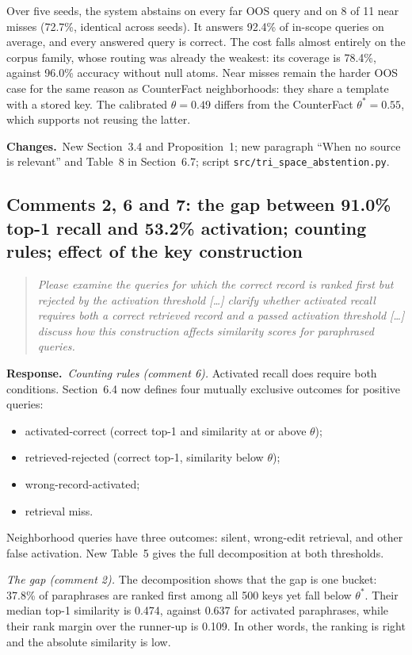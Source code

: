 \documentclass[11pt]{article}
\newenvironment{reviewer}{\par\medskip\noindent\begin{quote}\itshape}{\end{quote}}
\newcommand{\response}{\par\noindent\textbf{Response.}\ }
\newcommand{\changes}{\par\smallskip\noindent\textbf{Changes.}\ }
\begin{document}
Over five seeds, the system abstains on every far OOS query and on 8 of 11 near misses (72.7\%, identical across seeds). It answers 92.4\% of in-scope queries on average, and every answered query is correct. The cost falls almost entirely on the corpus family, whose routing was already the weakest: its coverage is 78.4\%, against 96.0\% accuracy without null atoms. Near misses remain the harder OOS case for the same reason as CounterFact neighborhoods: they share a template with a stored key. The calibrated $\theta=0.49$ differs from the CounterFact $\theta^*=0.55$, which supports not reusing the latter.

\changes New Section~3.4 and Proposition~1; new paragraph ``When no source is relevant'' and Table~8 in Section~6.7; script \texttt{src/tri\_space\_abstention.py}.

\subsection*{Comments 2, 6 and 7: the gap between 91.0\% top-1 recall and 53.2\% activation; counting rules; effect of the key construction}

\begin{reviewer}
Please examine the queries for which the correct record is ranked first but rejected by the activation threshold [\dots] clarify whether activated recall requires both a correct retrieved record and a passed activation threshold [\dots] discuss how this construction affects similarity scores for paraphrased queries.
\end{reviewer}

\response \emph{Counting rules (comment 6).} Activated recall does require both conditions. Section~6.4 now defines four mutually exclusive outcomes for positive queries:
\begin{itemize}
\item activated-correct (correct top-1 and similarity at or above $\theta$);
\item retrieved-rejected (correct top-1, similarity below $\theta$);
\item wrong-record-activated;
\item retrieval miss.
\end{itemize}
Neighborhood queries have three outcomes: silent, wrong-edit retrieval, and other false activation. New Table~5 gives the full decomposition at both thresholds.

\emph{The gap (comment 2).} The decomposition shows that the gap is one bucket: 37.8\% of paraphrases are ranked first among all 500 keys yet fall below $\theta^*$. Their median top-1 similarity is 0.474, against 0.637 for activated paraphrases, while their rank margin over the runner-up is 0.109. In other words, the ranking is right and the absolute similarity is low.
\end{document}

